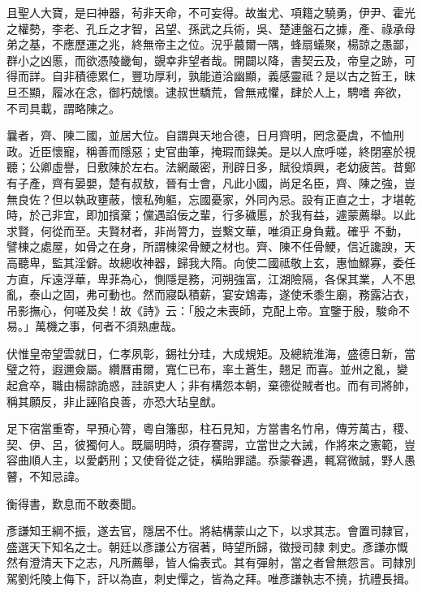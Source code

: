 \begin{pinyinscope}
 且聖人大寶，是曰神器，茍非天命，不可妄得。故蚩尤、項籍之驍勇，伊尹、霍光之權勢，李老、孔丘之才智，呂望、孫武之兵術，吳、楚連盤石之據，產、祿承母弟之基，不應歷運之兆，終無帝主之位。況乎蕞爾一隅，蜂扇蟻聚，楊諒之愚鄙，群小之凶慝，而欲憑陵畿甸，覬幸非望者哉。開闢以降，書契云及，帝皇之跡，可得而詳。自非積德累仁，豐功厚利，孰能道洽幽顯，義感靈祗？是以古之哲王，昧旦丕顯，履冰在念，御朽兢懷。逮叔世驕荒，曾無戒懼，肆於人上，騁嗜
 奔欲，不司具載，謂略陳之。



 曩者，齊、陳二國，並居大位。自謂與天地合德，日月齊明，罔念憂虞，不恤刑政。近臣懷寵，稱善而隱惡；史官曲筆，掩瑕而錄美。是以人庶呼嗟，終閉塞於視聽；公卿虛譽，日敷陳於左右。法網嚴密，刑辟日多，賦役煩興，老幼疲苦。昔鄭有子產，齊有晏嬰，楚有叔敖，晉有士會，凡此小國，尚足名臣，齊、陳之強，豈無良佐？但以執政壅蔽，懷私殉軀，忘國憂家，外同內忌。設有正直之士，才堪乾時，於己非宜，即加擯棄；儻遇諂佞之輩，行多穢慝，於我有益，遽蒙薦舉。以此求賢，何從而至。夫賢材者，非尚膂力，豈繫文華，唯須正身負戴。確乎
 不動，譬棟之處屋，如骨之在身，所謂棟梁骨鯁之材也。齊、陳不任骨鯁，信近讒諛，天高聽卑，監其淫僻。故總收神器，歸我大隋。向使二國祗敬上玄，惠恤鰥寡，委任方直，斥遠浮華，卑菲為心，惻隱是務，河朔強富，江湖險隔，各保其業，人不思亂，泰山之固，弗可動也。然而寢臥積薪，宴安鴆毒，遂使禾黍生廟，務露沾衣，吊影撫心，何嗟及矣！故《詩》云：「殷之未喪師，克配上帝。宜鑒于殷，駿命不易。」萬機之事，何者不須熟慮哉。



 伏惟皇帝望雲就日，仁孝夙彰，錫社分珪，大成規矩。及總統淮海，盛德日新，當璧之符，遐邇僉屬。纘曆甫爾，寬仁已布，率土蒼生，翹足
 而喜。並州之亂，變起倉卒，職由楊諒詭惑，詿誤吏人；非有構怨本朝，棄德從賊者也。而有司將帥，稱其願反，非止誣陷良善，亦恐大玷皇猷。



 足下宿當重寄，早預心膂，粵自籓邸，柱石見知，方當書名竹帛，傳芳萬古，稷、契、伊、呂，彼獨何人。既屬明時，須存謇諤，立當世之大誡，作將來之憲範，豈容曲順人主，以愛虧刑；又使脅從之徒，橫貽罪譴。忝蒙眷遇，輒寫微誠，野人愚瞽，不知忌諱。



 衡得書，歎息而不敢奏聞。



 彥謙知王綱不振，遂去官，隱居不仕。將結構蒙山之下，以求其志。會置司隸官，盛選天下知名之士。朝廷以彥謙公方宿著，時望所歸，徵授司隸
 刺史。彥謙亦慨然有澄清天下之志，凡所薦舉，皆人倫表式。其有彈射，當之者曾無怨言。司隸別駕劉灹陵上侮下，訐以為直，刺史憚之，皆為之拜。唯彥謙執志不撓，抗禮長揖。




\end{pinyinscope}
